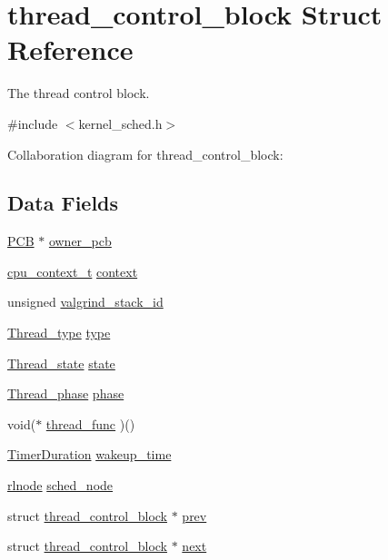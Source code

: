 \hypertarget{structthread__control__block}{}\section{thread\+\_\+control\+\_\+block Struct Reference}
\label{structthread__control__block}


The thread control block.  




{\ttfamily \#include $<$kernel\+\_\+sched.\+h$>$}



Collaboration diagram for thread\+\_\+control\+\_\+block\+:
\subsection*{Data Fields}
\begin{DoxyCompactItemize}
\item 
\hyperlink{group__proc_gadf327f09ee935cf1734c14e8849f0421}{P\+CB} $\ast$ \hyperlink{structthread__control__block_a74aa312623cb8be2bc719d5210b58c04}{owner\+\_\+pcb}
\item 
\hyperlink{bios_8h_a6067c1395a75fc3e17f1ea6353065b54}{cpu\+\_\+context\+\_\+t} \hyperlink{structthread__control__block_a9c107039dffa851dde6edabd6cd3f89c}{context}
\item 
unsigned \hyperlink{structthread__control__block_ad8a2da36c0ad775c12c5f66f4fec9d41}{valgrind\+\_\+stack\+\_\+id}
\item 
\hyperlink{group__scheduler_ga18795bc1ab00161fc27ce34b1895fb03}{Thread\+\_\+type} \hyperlink{structthread__control__block_abd0f40bdcb22c701df03f560bbc42d5c}{type}
\item 
\hyperlink{group__scheduler_ga6c969c169777f82c104cf73e501df70f}{Thread\+\_\+state} \hyperlink{structthread__control__block_affd872365cf4768fa1c9bd1e196bb97c}{state}
\item 
\hyperlink{group__scheduler_gab180b4aa356776bddcd724cef4f5deae}{Thread\+\_\+phase} \hyperlink{structthread__control__block_aa7e8e6a00c5f9f25210a49589ad818f8}{phase}
\item 
void($\ast$ \hyperlink{structthread__control__block_a91a73f2ad3f727b7412b912b3d65109a}{thread\+\_\+func} )()
\item 
\hyperlink{bios_8h_ae7291e5cd742fb9bc6d4aaa0d51bd0ee}{Timer\+Duration} \hyperlink{structthread__control__block_a7dbf9ba7df67911abb7951e249f587b6}{wakeup\+\_\+time}
\item 
\hyperlink{group__rlists_ga8f6244877f7ce2322c90525217ea6e7a}{rlnode} \hyperlink{structthread__control__block_add433b079e04053fe70fdd2b92e1d6ad}{sched\+\_\+node}
\item 
struct \hyperlink{structthread__control__block}{thread\+\_\+control\+\_\+block} $\ast$ \hyperlink{structthread__control__block_a605a6e9bb8154b658ee72e193599d180}{prev}
\item 
struct \hyperlink{structthread__control__block}{thread\+\_\+control\+\_\+block} $\ast$ \hyperlink{structthread__control__block_ac6b51ca735291f730ca1d4c335fb9359}{next}
\end{DoxyCompactItemize}



